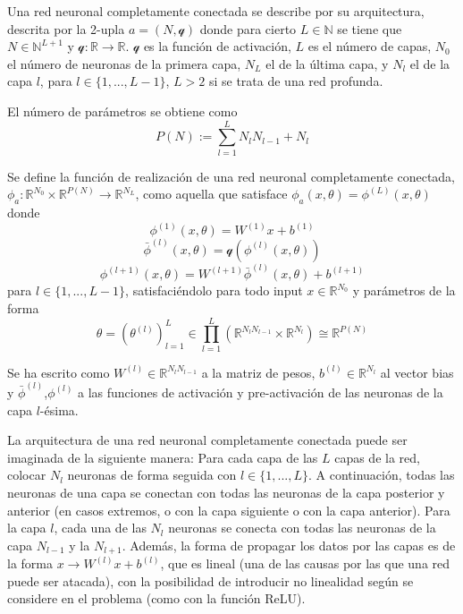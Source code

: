 \begin{definicion}
Una red neuronal completamente conectada se describe por su arquitectura, descrita por la 2-upla $a = (N,\mathcal{q})$ donde para cierto $L \in \mathbb{N}$ se tiene que $N \in \mathbb{N}^{L+1}$ y $\mathcal{q}: \mathbb{R} \to \mathbb{R}$. $\mathcal{q}$ es la función de activación, $L$ es el número de capas, $N_0$ el número de neuronas de la primera capa, $N_L$ el de la última capa, y $N_l$ el de la capa $l$, para $l \in \{1,...,L-1\}$, $L>2$ si se trata de una red profunda.
\end{definicion}

\begin{definicion}
El número de parámetros se obtiene como $$P(N) := \sum_{l=1}^{L}{N_lN_{l-1}}+N_l$$
\end{definicion}

\begin{definicion}
Se define la función de realización de una red neuronal completamente conectada, $\phi_a:\mathbb{R}^{N_0} \times \mathbb{R}^{P(N)} \to \mathbb{R}^{N_L}$, como aquella que satisface $\phi_a(x,\theta) = \phi^{(L)}(x,\theta)$ donde 
$$\phi^{(1)}(x,\theta) = W^{(1)}x + b^{(1)}$$ 
$$\bar{\phi}^{(l)}(x,\theta) = \mathcal{q}(\phi^{(l)}(x,\theta)) $$ 
$$\phi^{(l+1)}(x,\theta) = W^{(l+1)}\bar{\phi}^{(l)}(x,\theta)+b^{(l+1)}$$ 
para $l \in \{1,...,L-1\}$, satisfaciéndolo para todo input $x \in \mathbb{R}^{N_0}$ y parámetros de la forma 
$$\theta = (\theta^{(l)})_{l=1}^{L} \in \prod_{l=1}^{L}(\mathbb{R}^{N_l N_{l-1}} \times \mathbb{R}^{N_l}) \cong \mathbb{R}^{P(N)}$$

Se ha escrito como $W^{(l)} \in \mathbb{R}^{N_lN_{l-1}}$ a la matriz de pesos, $b^{(l)} \in \mathbb{R}^{N_l}$ al vector bias y $\bar{\phi}^{(l)}$,$\phi^{(l)}$ a las funciones de activación y pre-activación de las neuronas de la capa $l$-ésima.
\end{definicion}

La arquitectura de una red neuronal completamente conectada puede ser imaginada de la siguiente manera: Para cada capa de las $L$ capas de la red, colocar $N_l$ neuronas de forma seguida con $l \in \{1,...,L\}$. A continuación,  todas las neuronas de una capa se conectan con todas las neuronas de la capa posterior y anterior (en casos extremos, o con la capa siguiente o con la capa anterior). Para la capa $l$, cada una de las $N_l$ neuronas se conecta con todas las neuronas de la capa $N_{l-1}$ y la $N_{l+1}$. Además, la forma de propagar los datos por las capas es de la forma $x \to W^{(l)}x+b^{(l)}$, que es lineal (una de las causas por las que una red puede ser atacada), con la posibilidad de introducir no linealidad según se considere en el problema (como con la función ReLU). 

